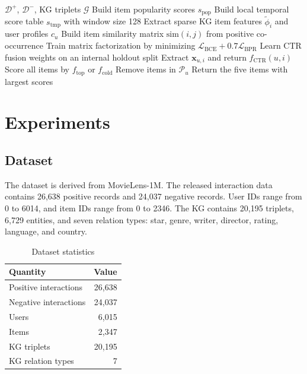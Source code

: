 \documentclass[onecolumn,a4paper,12pt]{IEEEtran}
\begin{document}
\begin{algorithm}[t]
\caption{Hybrid KG-based Recommendation}
\begin{algorithmic}[1]
\Require $\mathcal{D}^{+}$, $\mathcal{D}^{-}$, KG triplets $\mathcal{G}$
\State Build item popularity scores $s_{\mathrm{pop}}$
\State Build local temporal score table $s_{\mathrm{tmp}}$ with window size 128
\State Extract sparse KG item features $\tilde{\phi}_i$ and user profiles $c_u$
\State Build item similarity matrix $\mathrm{sim}(i,j)$ from positive co-occurrence
\State Train matrix factorization by minimizing $\mathcal{L}_{\mathrm{BCE}}+0.7\mathcal{L}_{\mathrm{BPR}}$
\State Learn CTR fusion weights on an internal holdout split
    \State Extract $\mathbf{x}_{u,i}$ and return $f_{\mathrm{CTR}}(u,i)$
\EndFor
{}
    \State Score all items by $f_{\mathrm{top}}$ or $f_{\mathrm{cold}}$
    \State Remove items in $\mathcal{P}_u$
    \State Return the five items with largest scores
\EndFor
\end{algorithmic}
\end{algorithm}

\section{Experiments}

\subsection{Dataset}

The dataset is derived from MovieLens-1M. The released interaction data contains 26,638 positive records and 24,037 negative records. User IDs range from 0 to 6014, and item IDs range from 0 to 2346. The KG contains 20,195 triplets, 6,729 entities, and seven relation types: star, genre, writer, director, rating, language, and country.

\begin{table}[h]
\centering
\caption{Dataset statistics}
\begin{tabular}{lr}
\toprule
Quantity & Value \\
\midrule
Positive interactions & 26,638 \\
Negative interactions & 24,037 \\
Users & 6,015 \\
Items & 2,347 \\
KG triplets & 20,195 \\
KG relation types & 7 \\
\bottomrule
\end{tabular}
\end{table}
\end{document}
